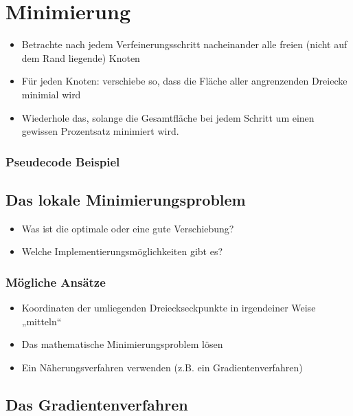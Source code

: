 \documentclass{beamer}
\begin{document}
\section{Minimierung}

\begin{frame}
	\begin{itemize}
		\item
			Betrachte nach jedem Verfeinerungsschritt nacheinander alle freien (nicht auf dem Rand liegende) Knoten
		\item
			Für jeden Knoten: verschiebe so, dass die Fläche aller angrenzenden Dreiecke minimial wird
		\item
			Wiederhole das, solange die Gesamtfläche bei jedem Schritt um einen gewissen Prozentsatz minimiert wird.
	\end{itemize}
\end{frame}

\begin{frame}
	\frametitle{Pseudecode Beispiel}
	
\end{frame}

\subsection{Das lokale Minimierungsproblem}

\begin{frame}
	\begin{itemize}
		\item
			Was ist die optimale oder eine gute Verschiebung?
		\item
			Welche Implementierungsmöglichkeiten gibt es?
	\end{itemize}
\end{frame}

\begin{frame}
	\frametitle{Mögliche Ansätze}
	\begin{itemize}
		\item
			Koordinaten der umliegenden Dreieckseckpunkte in irgendeiner Weise „mitteln“
		\item
			Das mathematische Minimierungsproblem lösen
		\item
			Ein Näherungsverfahren verwenden (z.B. ein Gradientenverfahren)
	\end{itemize}
\end{frame}

\subsection{Das Gradientenverfahren}
\end{document}
